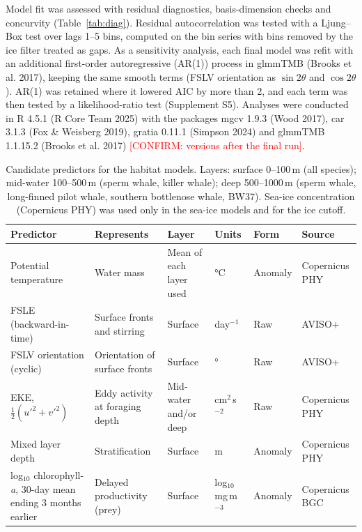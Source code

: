 \documentclass[11pt]{article}
\newcommand{\conf}[1]{\textcolor{red}{[CONFIRM: #1]}}
\newcommand{\chla}{chlorophyll-\textit{a}}
\newcommand{\unit}[1]{\,#1}
\begin{document}
Model fit was assessed with residual diagnostics, basis-dimension checks and concurvity (Table~\ref{tab:diag}). Residual autocorrelation was tested with a Ljung--Box test over lags 1--5 bins, computed on the bin series with bins removed by the ice filter treated as gaps. As a sensitivity analysis, each final model was refit with an additional first-order autoregressive (AR(1)) process in glmmTMB (Brooks et al. 2017), keeping the same smooth terms (FSLV orientation as $\sin 2\theta$ and $\cos 2\theta$). AR(1) was retained where it lowered AIC by more than 2, and each term was then tested by a likelihood-ratio test (Supplement S5). Analyses were conducted in R 4.5.1 (R Core Team 2025) with the packages mgcv 1.9.3 (Wood 2017), car 3.1.3 (Fox \& Weisberg 2019), gratia 0.11.1 (Simpson 2024) and glmmTMB 1.1.15.2 (Brooks et al. 2017) \conf{versions after the final run}.

\begin{table}[htbp]
\centering\footnotesize
\caption{Candidate predictors for the habitat models. Layers: surface 0--100\unit{m} (all species); mid-water 100--500\unit{m} (sperm whale, killer whale); deep 500--1000\unit{m} (sperm whale, long-finned pilot whale, southern bottlenose whale, BW37). Sea-ice concentration (Copernicus PHY) was used only in the sea-ice models and for the ice cutoff.}
\label{tab:pred}
\begin{tabular}{>{\raggedright}p{3.2cm}>{\raggedright}p{3.4cm}>{\raggedright}p{2.6cm}p{1.6cm}p{1.2cm}p{1.6cm}}
\toprule
Predictor & Represents & Layer & Units & Form & Source \\
\midrule
Potential temperature & Water mass & Mean of each layer used & °C & Anomaly & Copernicus PHY \\
FSLE (backward-in-time) & Surface fronts and stirring & Surface & day$^{-1}$ & Raw & AVISO+ \\
FSLV orientation (cyclic) & Orientation of surface fronts & Surface & ° & Raw & AVISO+ \\
EKE, $\frac{1}{2}(u'^2+v'^2)$ & Eddy activity at foraging depth & Mid-water and/or deep & cm$^2$\unit{s$^{-2}$} & Raw & Copernicus PHY \\
Mixed layer depth & Stratification & Surface & m & Anomaly & Copernicus PHY \\
log$_{10}$ \chla, 30-day mean ending 3 months earlier & Delayed productivity (prey) & Surface & log$_{10}$ mg\unit{m$^{-3}$} & Anomaly & Copernicus BGC \\
\bottomrule
\end{tabular}
\end{table}
\end{document}
